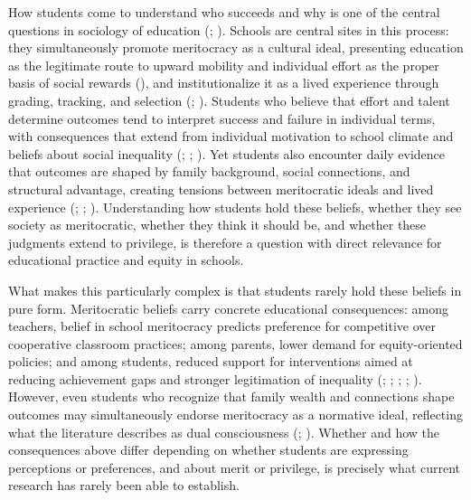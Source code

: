 \documentclass[
  13pt,
]{article}
\begin{document}
How students come to understand who succeeds and why is one of the
central questions in sociology of education
(;
). Schools are
central sites in this process: they simultaneously promote meritocracy
as a cultural ideal, presenting education as the legitimate route to
upward mobility and individual effort as the proper basis of social
rewards (), and institutionalize it as a lived experience through
grading, tracking, and selection
(;
). Students who
believe that effort and talent determine outcomes tend to interpret
success and failure in individual terms, with consequences that extend
from individual motivation to school climate and beliefs about social
inequality (; ;
). Yet
students also encounter daily evidence that outcomes are shaped by
family background, social connections, and structural advantage,
creating tensions between meritocratic ideals and lived experience
(;
;
). Understanding
how students hold these beliefs, whether they see society as
meritocratic, whether they think it should be, and whether these
judgments extend to privilege, is therefore a question with direct
relevance for educational practice and equity in schools.

What makes this particularly complex is that students rarely hold these
beliefs in pure form. Meritocratic beliefs carry concrete educational
consequences: among teachers, belief in school meritocracy predicts
preference for competitive over cooperative classroom practices; among
parents, lower demand for equity-oriented policies; and among students,
reduced support for interventions aimed at reducing achievement gaps and
stronger legitimation of inequality
(;
;
;
;
).
However, even students who recognize that family wealth and connections
shape outcomes may simultaneously endorse meritocracy as a normative
ideal, reflecting what the literature describes as dual consciousness
(;
). Whether and
how the consequences above differ depending on whether students are
expressing perceptions or preferences, and about merit or privilege, is
precisely what current research has rarely been able to establish.
\end{document}
